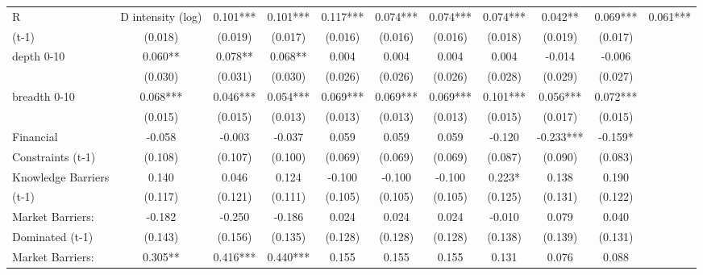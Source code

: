 \begin{table}[htbp]
\begin{tabular}{l*{9}{c}}
R&D intensity (log) &       0.101***&       0.101***&       0.117***&       0.074***&       0.074***&       0.074***&       0.042** &       0.069***&       0.061***\\
(t-1)               &     (0.018)   &     (0.019)   &     (0.017)   &     (0.016)   &     (0.016)   &     (0.016)   &     (0.018)   &     (0.019)   &     (0.017)   \\
depth 0-10          &       0.060** &       0.078** &       0.068** &       0.004   &       0.004   &       0.004   &       0.004   &      -0.014   &      -0.006   \\
                    &     (0.030)   &     (0.031)   &     (0.030)   &     (0.026)   &     (0.026)   &     (0.026)   &     (0.028)   &     (0.029)   &     (0.027)   \\
breadth 0-10        &       0.068***&       0.046***&       0.054***&       0.069***&       0.069***&       0.069***&       0.101***&       0.056***&       0.072***\\
                    &     (0.015)   &     (0.015)   &     (0.013)   &     (0.013)   &     (0.013)   &     (0.013)   &     (0.015)   &     (0.017)   &     (0.015)   \\
Financial           &      -0.058   &      -0.003   &      -0.037   &       0.059   &       0.059   &       0.059   &      -0.120   &      -0.233***&      -0.159*  \\
Constraints (t-1)   &     (0.108)   &     (0.107)   &     (0.100)   &     (0.069)   &     (0.069)   &     (0.069)   &     (0.087)   &     (0.090)   &     (0.083)   \\
Knowledge Barriers  &       0.140   &       0.046   &       0.124   &      -0.100   &      -0.100   &      -0.100   &       0.223*  &       0.138   &       0.190   \\
(t-1)               &     (0.117)   &     (0.121)   &     (0.111)   &     (0.105)   &     (0.105)   &     (0.105)   &     (0.125)   &     (0.131)   &     (0.122)   \\
Market Barriers:    &      -0.182   &      -0.250   &      -0.186   &       0.024   &       0.024   &       0.024   &      -0.010   &       0.079   &       0.040   \\
Dominated (t-1)     &     (0.143)   &     (0.156)   &     (0.135)   &     (0.128)   &     (0.128)   &     (0.128)   &     (0.138)   &     (0.139)   &     (0.131)   \\
Market Barriers:    &       0.305** &       0.416***&       0.440***&       0.155   &       0.155   &       0.155   &       0.131   &       0.076   &       0.088   \\

\end{tabular}
\end{table}

